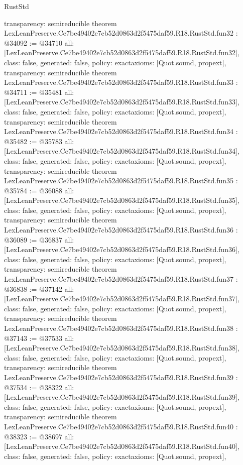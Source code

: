 \begin{lexlean}{RustStd}
\begin{coremodule}
{  transparency: semireducible
}
theorem LexLeanPreserve.Ce7be49402e7cb52d0863d2f5475daf59.R18.RustStd.fun32 : @34092 := @34710 {
  all: [LexLeanPreserve.Ce7be49402e7cb52d0863d2f5475daf59.R18.RustStd.fun32],
  class: false,
  generated: false,
  policy: exact{axioms: [Quot.sound, propext]},
  transparency: semireducible
}
theorem LexLeanPreserve.Ce7be49402e7cb52d0863d2f5475daf59.R18.RustStd.fun33 : @34711 := @35481 {
  all: [LexLeanPreserve.Ce7be49402e7cb52d0863d2f5475daf59.R18.RustStd.fun33],
  class: false,
  generated: false,
  policy: exact{axioms: [Quot.sound, propext]},
  transparency: semireducible
}
theorem LexLeanPreserve.Ce7be49402e7cb52d0863d2f5475daf59.R18.RustStd.fun34 : @35482 := @35783 {
  all: [LexLeanPreserve.Ce7be49402e7cb52d0863d2f5475daf59.R18.RustStd.fun34],
  class: false,
  generated: false,
  policy: exact{axioms: [Quot.sound, propext]},
  transparency: semireducible
}
theorem LexLeanPreserve.Ce7be49402e7cb52d0863d2f5475daf59.R18.RustStd.fun35 : @35784 := @36088 {
  all: [LexLeanPreserve.Ce7be49402e7cb52d0863d2f5475daf59.R18.RustStd.fun35],
  class: false,
  generated: false,
  policy: exact{axioms: [Quot.sound, propext]},
  transparency: semireducible
}
theorem LexLeanPreserve.Ce7be49402e7cb52d0863d2f5475daf59.R18.RustStd.fun36 : @36089 := @36837 {
  all: [LexLeanPreserve.Ce7be49402e7cb52d0863d2f5475daf59.R18.RustStd.fun36],
  class: false,
  generated: false,
  policy: exact{axioms: [Quot.sound, propext]},
  transparency: semireducible
}
theorem LexLeanPreserve.Ce7be49402e7cb52d0863d2f5475daf59.R18.RustStd.fun37 : @36838 := @37142 {
  all: [LexLeanPreserve.Ce7be49402e7cb52d0863d2f5475daf59.R18.RustStd.fun37],
  class: false,
  generated: false,
  policy: exact{axioms: [Quot.sound, propext]},
  transparency: semireducible
}
theorem LexLeanPreserve.Ce7be49402e7cb52d0863d2f5475daf59.R18.RustStd.fun38 : @37143 := @37533 {
  all: [LexLeanPreserve.Ce7be49402e7cb52d0863d2f5475daf59.R18.RustStd.fun38],
  class: false,
  generated: false,
  policy: exact{axioms: [Quot.sound, propext]},
  transparency: semireducible
}
theorem LexLeanPreserve.Ce7be49402e7cb52d0863d2f5475daf59.R18.RustStd.fun39 : @37534 := @38322 {
  all: [LexLeanPreserve.Ce7be49402e7cb52d0863d2f5475daf59.R18.RustStd.fun39],
  class: false,
  generated: false,
  policy: exact{axioms: [Quot.sound, propext]},
  transparency: semireducible
}
theorem LexLeanPreserve.Ce7be49402e7cb52d0863d2f5475daf59.R18.RustStd.fun40 : @38323 := @38697 {
  all: [LexLeanPreserve.Ce7be49402e7cb52d0863d2f5475daf59.R18.RustStd.fun40],
  class: false,
  generated: false,
  policy: exact{axioms: [Quot.sound, propext]},
}
\end{coremodule}
\end{lexlean}
